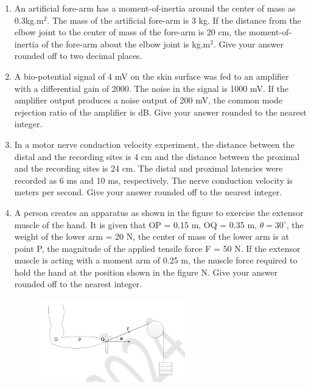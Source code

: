 \documentclass[a4paper,12pt]{exam}
\numberwithin{equation}{enumi}
\numberwithin{figure}{enumi}
\begin{document}
\begin{enumerate}
\hfill{}

\item An artificial fore-arm has a moment-of-inertia around the center of mass as 0.3kg.$\text{m}^2$.  
The mass of the artificial fore-arm is 3 kg. If the distance from the elbow joint to the center of mass of the fore-arm is 20 cm, the moment-of-inertia of the fore-arm about the elbow joint is \underline{\hspace{1cm}} kg.$\text{m}^2$. Give your answer rounded off to two decimal places. 

\hfill{}

\item A bio-potential signal of 4 mV on the skin surface was fed to an amplifier with a differential gain of 2000. The noise in the signal is 1000 mV. If the amplifier output produces a noise output of 200 mV, the common mode rejection ratio of the amplifier
is \underline{\hspace{1cm}} dB. Give your answer rounded to the nearest integer.

\hfill{}

\item In a motor nerve conduction velocity experiment, the distance between the distal and the recording sites is 4 cm and the distance between the proximal and the recording sites is 24 cm. The distal and proximal latencies were recorded as 6 ms and 10 ms, 
respectively. The nerve conduction velocity is \underline{\hspace{1cm}} meters per second. Give your answer rounded off to the nearest integer.

\hfill{}

\item A person creates an apparatus as shown in the figure to exercise the extensor muscle 
of the hand. It is given that OP = 0.15 m, OQ = 0.35 m, $\theta = 30^\circ$, the weight of the 
lower arm = 20 N, the center of mass of the lower arm is at point P, the magnitude of the applied tensile force F = 50 N. If the extensor muscle is acting with a moment arm of 0.25 m, the muscle force required to hold the hand at the position shown in the figure \underline{\hspace{1cm}}N. Give your answer rounded off to the nearest integer.

\hfill{}

\begin{figure}[H]
\centering
\includegraphics[width=0.6\textwidth]{figs/Q65.png}
\label{fig:Q65.png}
\end{figure}


\end{enumerate}
\end{document}
